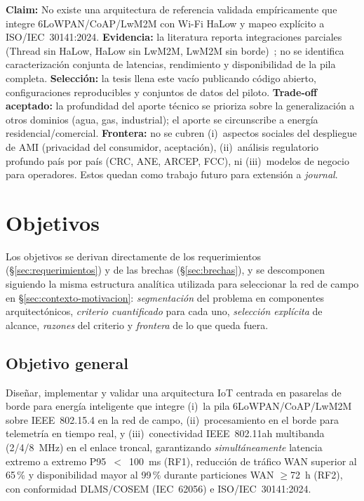 \textbf{Claim:} No existe una arquitectura de referencia validada empíricamente que integre 6LoWPAN/CoAP/LwM2M con Wi-Fi HaLow y mapeo explícito a ISO/IEC~30141:2024.
\textbf{Evidencia:} la literatura reporta integraciones parciales (Thread sin HaLow, HaLow sin LwM2M, LwM2M sin borde)~\cite{alharbi6LoWPANBasedAMI2021,jonnakutiEDGEBASEDFAULTDETECTION}; no se identifica caracterización conjunta de latencias, rendimiento y disponibilidad de la pila completa.
\textbf{Selección:} la tesis llena este vacío publicando código abierto, configuraciones reproducibles y conjuntos de datos del piloto.
\textbf{Trade-off aceptado:} la profundidad del aporte técnico se prioriza sobre la generalización a otros dominios (agua, gas, industrial); el aporte se circunscribe a energía residencial/comercial.
\textbf{Frontera:} no se cubren (i)~aspectos sociales del despliegue de AMI (privacidad del consumidor, aceptación), (ii)~análisis regulatorio profundo país por país (CRC, ANE, ARCEP, FCC), ni (iii)~modelos de negocio para operadores. Estos quedan como trabajo futuro para extensión a \emph{journal}.

\section{Objetivos}
\label{sec:objetivos}

Los objetivos se derivan directamente de los requerimientos (§\ref{sec:requerimientos}) y de las brechas (§\ref{sec:brechas}), y se descomponen siguiendo la misma estructura analítica utilizada para seleccionar la red de campo en §\ref{sec:contexto-motivacion}: \emph{segmentación} del problema en componentes arquitectónicos, \emph{criterio cuantificado} para cada uno, \emph{selección explícita} de alcance, \emph{razones} del criterio y \emph{frontera} de lo que queda fuera.

\subsection{Objetivo general}

Diseñar, implementar y validar una arquitectura IoT centrada en pasarelas de borde para energía inteligente que integre (i)~la pila 6LoWPAN/CoAP/LwM2M sobre IEEE~802.15.4 en la red de campo, (ii)~procesamiento en el borde para telemetría en tiempo real, y (iii)~conectividad IEEE~802.11ah multibanda (2/4/8~MHz) en el enlace troncal, garantizando \emph{simultáneamente} latencia extremo a extremo P95~$<$~100~ms (RF1), reducción de tráfico WAN superior al 65\,\% y disponibilidad mayor al 99\,\% durante particiones WAN $\geq$72~h (RF2), con conformidad DLMS/COSEM (IEC~62056) e ISO/IEC~30141:2024.

